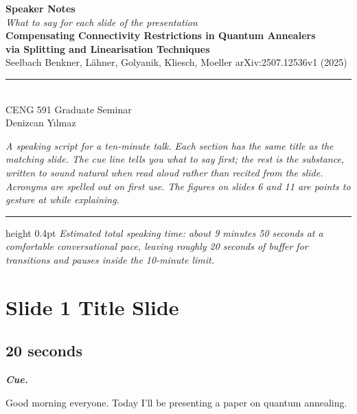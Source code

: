 \documentclass[11pt,a4paper]{article}
\newenvironment{cue}{%
  \par\noindent
  \begin{minipage}{\linewidth}
  \color{muted}\small\itshape
  \textbf{\color{accent}\upshape Cue.}~%
}{%
  \end{minipage}\par\medskip
}
\begin{document}
\begin{center}
\vspace*{1.4cm}
{\LARGE\bfseries\color{accent} Speaker Notes}\\[0.4em]
{\large\itshape What to say for each slide of the presentation}\\[2em]
{\large\bfseries Compensating Connectivity Restrictions in Quantum Annealers}\\
{\large\bfseries via Splitting and Linearisation Techniques}\\[0.6em]
{\normalsize Seelbach Benkner, L\"ahner, Golyanik, Kliesch, Moeller \quad arXiv:2507.12536v1 (2025)}\\[1.6em]
\rule{0.5\linewidth}{0.4pt}\\[0.7em]
{\normalsize CENG 591 Graduate Seminar}\\
{\normalsize Denizcan Y\i lmaz }\\[1.6em]
\begin{minipage}{0.85\linewidth}
\small\itshape\color{muted}
A speaking script for a ten-minute talk. Each section has the same title as the matching slide. The cue line tells you what to say first; the rest is the substance, written to sound natural when read aloud rather than recited from the slide. Acronyms are spelled out on first use. The figures on slides 6 and 11 are points to gesture at while explaining.
\end{minipage}
\end{center}

\vspace*{\fill}
\hrule height 0.4pt
\vspace{0.4em}
\noindent\small\itshape\color{muted}Estimated total speaking time: about 9 minutes 50 seconds at a comfortable conversational pace, leaving roughly 20 seconds of buffer for transitions and pauses inside the 10-minute limit.

\newpage

\section*{Slide 1 \quad Title Slide}
\subsection*{20 seconds}

\begin{cue}
Good morning everyone. Today I'll be presenting a paper on quantum annealing.
\end{cue}
\end{document}
